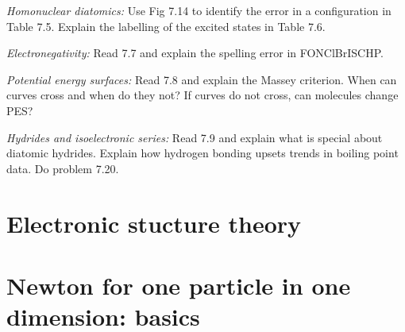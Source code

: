 \item
{\em Homonuclear diatomics:}
Use Fig 7.14 to identify the error in a configuration in Table 7.5.
Explain the labelling of the excited states in Table 7.6.

\item
{\em Electronegativity:}
Read 7.7 and explain the spelling error in FONClBrISCHP.

\item
{\em Potential energy surfaces:}
Read 7.8 and explain the Massey criterion.  When can curves cross
and when do they not?  If curves do not cross, can molecules change
PES?

\item
{\em Hydrides and isoelectronic series:}
Read 7.9 and explain what is special about diatomic hydrides.
Explain how hydrogen bonding upsets trends in boiling point data.
Do problem 7.20.


\enu
\newpage


\part{Electronic stucture theory}
\label{page:end}


\part{Newton for one particle in one dimension: basics}
\newpage
{}

